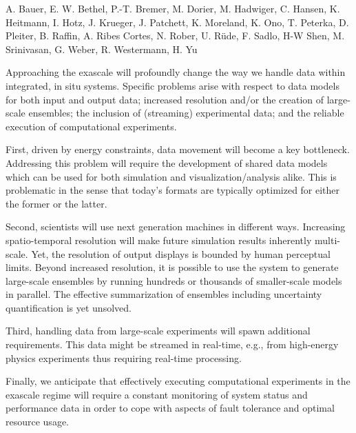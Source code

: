 \license

 A. Bauer, E. W. Bethel, P.-T. Bremer, M. Dorier, M. Hadwiger, C. Hansen, K. Heitmann, I. Hotz, J. Krueger, J. Patchett, K. Moreland, K. Ono, T. Peterka, D. Pleiter, B. Raffin, A. Ribes Cortes, N. Rober, U. R\"ude, F. Sadlo, H-W Shen, M. Srinivasan, G. Weber, R. Westermann, H. Yu

\begin{refsection}

Approaching the exascale will profoundly change the way we handle data within integrated, in situ systems. 
Specific problems arise with respect to data models for both input and output data; increased resolution and/or the creation of large-scale ensembles; the inclusion of (streaming) experimental data; and the reliable execution of computational experiments.

First, driven by energy constraints, data movement will become a key bottleneck. 
Addressing this problem will require the development of shared data models which can be used for both simulation and visualization/analysis alike. 
This is problematic in the sense that today’s formats are typically optimized for either the former or the latter. 

Second, scientists will use next generation machines in different ways. 
Increasing spatio-temporal resolution will make future simulation results inherently multi-scale. 
Yet, the resolution of output displays is bounded by human perceptual limits.
Beyond increased resolution, it is possible to use the system to generate large-scale ensembles by running hundreds or thousands of smaller-scale models in parallel. 
The effective summarization of ensembles including uncertainty quantification is yet unsolved. 

Third, handling data from large-scale experiments will spawn additional requirements. 
This data might be streamed in real-time, e.g., from high-energy physics experiments thus requiring real-time processing. 

Finally, we anticipate that effectively executing computational experiments in the exascale regime will require a constant monitoring of system status and performance data in order to cope with aspects of fault tolerance and optimal resource usage.


\end{refsection}
